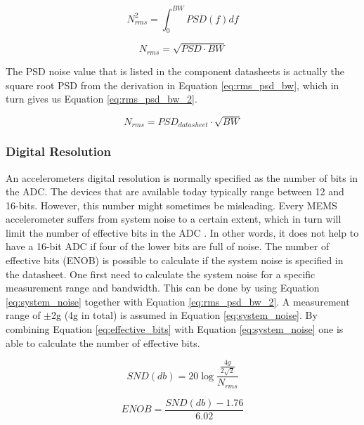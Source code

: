 \begin{equation}
N^{2}_{rms}=\int_0^{BW}{PSD(f)df}
\label{eq:rms_noise}
\end{equation}

\begin{equation}
N_{rms}=\sqrt{PSD \cdot BW}
\label{eq:rms_psd_bw}
\end{equation}

The PSD noise value that is listed in the component datasheets is actually the square root PSD from the derivation in Equation \ref{eq:rms_psd_bw}, which in turn gives us Equation \ref{eq:rms_psd_bw_2}.

\begin{equation}
N_{rms}=PSD_{datasheet} \cdot \sqrt{BW}
\label{eq:rms_psd_bw_2}
\end{equation}

\subsubsection{Digital Resolution}

An accelerometers digital resolution is normally specified as the number of bits in the ADC. The devices that are available today typically range between 12 and 16-bits. However, this number might sometimes be misleading. Every MEMS accelerometer suffers from system noise to a certain extent, which in turn will limit the number of effective bits in the ADC \cite[~p.3]{freescale_accel_terminology}. In other words, it does not help to have a 16-bit ADC if four of the lower bits are full of noise. The number of effective bits (ENOB) is possible to calculate if the system noise is specified in the datasheet. One first need to calculate the system noise for a specific measurement range and bandwidth. This can be done by using Equation \ref{eq:system_noise} together with Equation \ref{eq:rms_psd_bw_2}. A measurement range of $\pm$2g (4g in total) is assumed in Equation \ref{eq:system_noise}. By combining Equation \ref{eq:effective_bits} with Equation \ref{eq:system_noise} one is able to calculate the number of effective bits. 

\begin{equation}
SND(db) = 20\log{\frac{\frac{4g}{2\sqrt{2}}}{N_{rms}}}
\label{eq:system_noise}
\end{equation}

\begin{equation}
ENOB = \frac{SND(db)-1.76}{6.02}
\label{eq:effective_bits}
\end{equation}